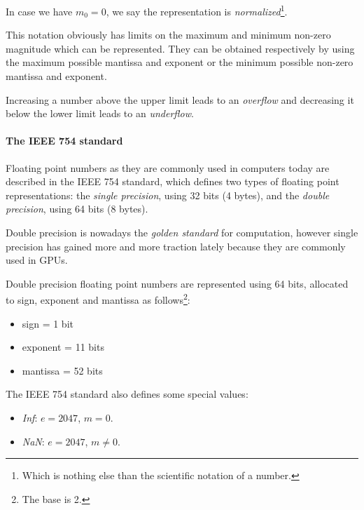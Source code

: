 \begin{Rem}
	In case we have $m_0 = 0$,  we say the representation is \emph{normalized}\footnote{Which is nothing else than the scientific notation of a number.}.
\end{Rem}

\begin{Rem}
	This notation obviously has limits on the maximum and minimum non-zero magnitude which can be represented. They can be obtained respectively by using the maximum possible mantissa and exponent or the minimum possible non-zero mantissa and exponent.

	Increasing a number above the upper limit leads to an \emph{overflow} and decreasing it below the lower limit leads to an \emph{underflow}.
\end{Rem}

\paragraph{The IEEE 754 standard}
Floating point numbers as they are commonly used in computers today are described in the IEEE 754 standard, which defines two types of floating point representations: the \emph{single precision}, using 32 bits (4 bytes), and the \emph{double precision}, using 64 bits (8 bytes).

Double precision is nowadays the \emph{golden standard} for computation, however single precision has gained more and more traction lately because they are commonly used in GPUs.

\begin{Def}
	Double precision floating point numbers are represented using 64 bits, allocated to sign, exponent and mantissa as follows\footnote{The base is 2.}:
	\begin{itemize}
		\item sign = 1 bit
		\item exponent = 11 bits
		\item mantissa = 52 bits
	\end{itemize}
\end{Def}

The IEEE 754 standard also defines some special values:
\begin{itemize}
	\item \emph{Inf}: $e = 2047$, $m = 0$.
	\item \emph{NaN}: $e = 2047$, $m \neq 0$.
\end{itemize}

